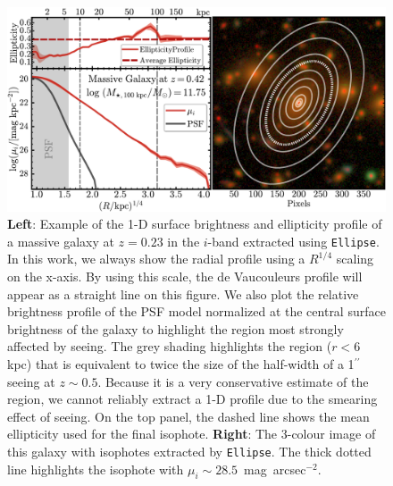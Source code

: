 \documentclass[fleqn,usenatbib]{mnras}
\def\asec{$^{\prime\prime}$}
\def\sb{mag~arcsec$^{-2}$}
\begin{document}

    \begin{figure}
        \centering 
        \includegraphics[width=\textwidth]{fig/redbcg_ellipse_example}
        \caption{
            \textbf{Left}: Example of the 1-D surface brightness and ellipticity 
            profile of a massive galaxy at $z=0.23$ in the $i$-band extracted using 
            \texttt{Ellipse}. 
            In this work, we always show the radial profile using a $R^{1/4}$ scaling 
            on the x-axis.
            By using this scale, the de Vaucouleurs profile will appear as a straight 
            line on this figure.  
            We also plot the relative brightness profile of the PSF model normalized 
            at the central surface brightness of the galaxy to highlight the region 
            most strongly affected by seeing.
            The grey shading highlights the region ($r<6$ kpc) that is equivalent 
            to twice the size of the half-width of a 1\asec{} seeing at $z\sim 0.5$.
            Because it is a very conservative estimate of the region, we cannot reliably 
            extract a 1-D profile due to the smearing effect of seeing.
            On the top panel, the dashed line shows the mean ellipticity used for the 
            final isophote. 
            \textbf{Right}: The 3-colour image of this galaxy with isophotes 
            extracted by \texttt{Ellipse}. 
            The thick dotted line highlights the isophote with 
            $\mu_{i}{\sim} 28.5$~\sb.
            }
        \label{fig:ellipse}
    \end{figure}
\end{document}
